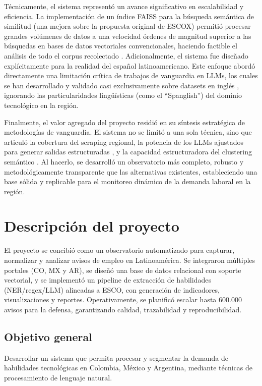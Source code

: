 Técnicamente, el sistema representó un avance significativo en escalabilidad y eficiencia. La implementación de un índice FAISS para la búsqueda semántica de similitud (una mejora sobre la propuesta original de ESCOX) permitió procesar grandes volúmenes de datos a una velocidad órdenes de magnitud superior a las búsquedas en bases de datos vectoriales convencionales, haciendo factible el análisis de todo el corpus recolectado \cite{kavargyris2025, lukauskas2023}. Adicionalmente, el sistema fue diseñado explícitamente para la realidad del español latinoamericano. Este enfoque abordó directamente una limitación crítica de trabajos de vanguardia en LLMs, los cuales se han desarrollado y validado casi exclusivamente sobre datasets en inglés \cite{herandi2024}, ignorando las particularidades lingüísticas (como el ``Spanglish'') del dominio tecnológico en la región.

Finalmente, el valor agregado del proyecto residió en su síntesis estratégica de metodologías de vanguardia. El sistema no se limitó a una sola técnica, sino que articuló la cobertura del scraping regional, la potencia de los LLMs ajustados para generar salidas estructuradas \cite{herandi2024}, y la capacidad estructuradora del clustering semántico \cite{lukauskas2023}. Al hacerlo, se desarrolló un observatorio más completo, robusto y metodológicamente transparente que las alternativas existentes, estableciendo una base sólida y replicable para el monitoreo dinámico de la demanda laboral en la región.

\section{Descripción del proyecto}

El proyecto se concibió como un observatorio automatizado para capturar, normalizar y analizar avisos de empleo en Latinoamérica. Se integraron múltiples portales (CO, MX y AR), se diseñó una base de datos relacional con soporte vectorial, y se implementó un pipeline de extracción de habilidades (NER/regex/LLM) alineadas a ESCO, con generación de indicadores, visualizaciones y reportes. Operativamente, se planificó escalar hasta 600.000 avisos para la defensa, garantizando calidad, trazabilidad y reproducibilidad.

\subsection{Objetivo general}

Desarrollar un sistema que permita procesar y segmentar la demanda de habilidades tecnológicas en Colombia, México y Argentina, mediante técnicas de procesamiento de lenguaje natural.

